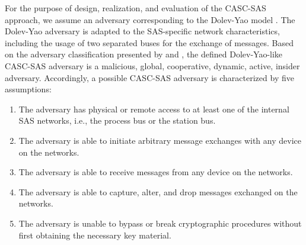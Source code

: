 For the purpose of design, realization, and evaluation of the CASC-SAS approach, we assume an adversary corresponding to the Dolev-Yao model \cite{Dolev1983}.
The Dolev-Yao adversary is adapted to the SAS-specific network characteristics, including the usage of two separated buses for the exchange of messages.
Based on the adversary classification presented by \citeauthor{Hof2007} \cite{Hof2007} and \citeauthor{Ponikwar2016} \cite{Ponikwar2016}, the defined Dolev-Yao-like CASC-SAS adversary is a malicious, global, cooperative, dynamic, active, insider adversary.
Accordingly, a possible CASC-SAS adversary is characterized by five assumptions:
\begin{enumerate}
    \item The adversary has physical or remote access to at least one of the internal SAS networks, i.e., the process bus or the station bus.
    \item The adversary is able to initiate arbitrary message exchanges with any device on the networks.
    \item The adversary is able to receive messages from any device on the networks.
    \item The adversary is able to capture, alter, and drop messages exchanged on the networks.
    \item The adversary is unable to bypass or break cryptographic procedures without first obtaining the necessary key material.
\end{enumerate}

